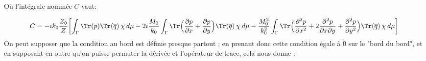 Où l'intégrale nommée $C$ vaut:

\begin{equation}
    C = -ik_0\frac{Z_0}{Z} \biggl[ \int_{\Gamma} \Tr(p) \Tr(\overline{q}) \hspace{2pt} \chi \hspace{2pt} d\mu - 2i\frac{M_0}{k_0} \int_{\Gamma} \Tr \Bigl( \frac{\partial p}{\partial x}+\frac{\partial p}{\partial y} \Bigr) \Tr(\overline{q}) \hspace{2pt} \chi \hspace{2pt} d\mu - \frac{M_0^2}{k_0^2} \int_{\Gamma} \Tr \Bigl( \frac{\partial^2 p}{\partial x^2}+2\frac{\partial^2 p}{\partial x \partial y} + \frac{\partial^2 p}{\partial y^2} \Bigr)\Tr(\overline{q}) \hspace{2pt} \chi  \hspace{2pt} d\mu \biggl]
\end{equation}
On peut supposer que la condition au bord est définie presque partout ; en prenant donc cette condition égale à 0 sur le "bord du bord", et en supposant en outre qu'on puisse permuter la dérivée et l'opérateur de trace, cela nous donne :




